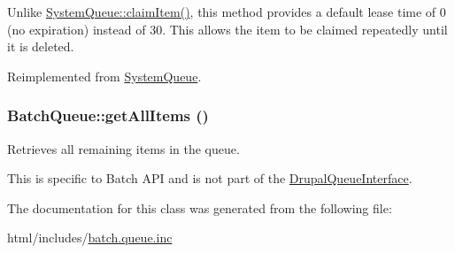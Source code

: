 Unlike \hyperlink{classSystemQueue_aa5f774d4ef4b31f1318751d9b9872071}{SystemQueue::claimItem()}, this method provides a default lease time of 0 (no expiration) instead of 30. This allows the item to be claimed repeatedly until it is deleted. 

Reimplemented from \hyperlink{classSystemQueue_aa5f774d4ef4b31f1318751d9b9872071}{SystemQueue}.\hypertarget{classBatchQueue_ace0935cd7b32c943d32122a1ce277d6e}{
\subsubsection[{getAllItems}]{\setlength{\rightskip}{0pt plus 5cm}BatchQueue::getAllItems ()}}
\label{classBatchQueue_ace0935cd7b32c943d32122a1ce277d6e}
Retrieves all remaining items in the queue.

This is specific to Batch API and is not part of the \hyperlink{interfaceDrupalQueueInterface}{DrupalQueueInterface}. 

The documentation for this class was generated from the following file:\begin{DoxyCompactItemize}
\item 
html/includes/\hyperlink{batch_8queue_8inc}{batch.queue.inc}\end{DoxyCompactItemize}
